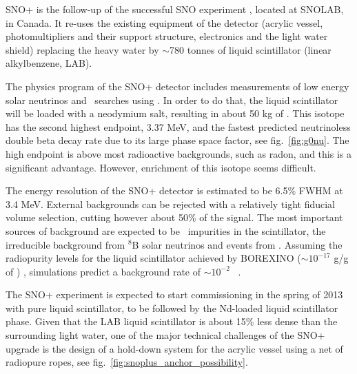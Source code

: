 SNO+ \cite{Kraus:2010zzb} is the follow-up of the successful SNO experiment \cite{SNO:1999crp}, located at SNOLAB, in Canada. It re-uses the existing equipment of the detector (acrylic vessel, photomultipliers and their support structure, electronics and the light water shield) replacing the heavy water by $\sim$780 tonnes of liquid scintillator (linear alkylbenzene, LAB).

The physics program of the SNO+ detector includes measurements of low energy solar neutrinos and \bbonu\ searches using \ND. In order to do that, the liquid scintillator will be loaded with a neodymium salt, resulting in about 50 kg of \ND. This isotope has the second highest endpoint, 3.37 MeV, and the fastest predicted neutrinoless double beta decay rate due to its large phase space factor, see fig.~\ref{fig:g0nu}. The high endpoint is above most radioactive backgrounds, such as radon, and this is a significant advantage. However, enrichment of this isotope seems difficult.

The energy resolution of the SNO+ detector is estimated to be 6.5\% FWHM at 3.4 MeV. External backgrounds can be rejected with a relatively tight fiducial volume selection, cutting however about 50\% of the signal. The most important sources of background are expected to be \TL\ impurities in the scintillator, the irreducible background from $^{8}$B solar neutrinos and  events from \ND . Assuming the radiopurity levels for the liquid scintillator achieved by BOREXINO ($\sim10^{-17}$ g/g of \TL) \cite{Borexino:2009awt}, simulations predict a background rate of $\sim10^{-2}$ \ckkbby\ \cite{Wright:2009csa}. 

The SNO+ experiment is expected to start commissioning in the spring of 2013 with pure liquid scintillator, to be followed by the Nd-loaded liquid scintillator phase. Given that the LAB liquid scintillator is about 15\%  less dense than the surrounding light water, one of the major technical challenges of the SNO+ upgrade is the design of a hold-down system for the acrylic vessel using a net of radiopure ropes, see fig.~\ref{fig:snoplus_anchor_possibility}.  

